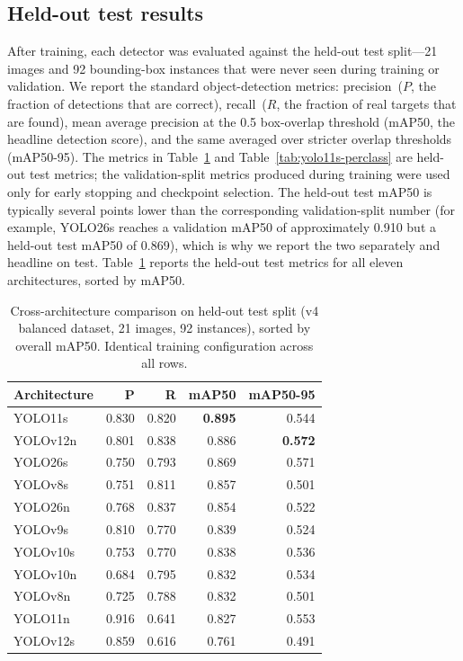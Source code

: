 \documentclass[10pt, letterpaper, twocolumn]{article}
\begin{document}
\subsection{Held-out test results}
\label{sec:results-test}

After training, each detector was evaluated against the held-out test split---21 images and 92 bounding-box instances that were never seen during training or validation. We report the standard object-detection metrics: precision~($P$, the fraction of detections that are correct), recall~($R$, the fraction of real targets that are found), mean average precision at the 0.5 box-overlap threshold (mAP50, the headline detection score), and the same averaged over stricter overlap thresholds (mAP50-95). The metrics in Table~\ref{tab:cross-arch} and Table~\ref{tab:yolo11s-perclass} are held-out test metrics; the validation-split metrics produced during training were used only for early stopping and checkpoint selection. The held-out test mAP50 is typically several points lower than the corresponding validation-split number (for example, YOLO26s reaches a validation mAP50 of approximately 0.910 but a held-out test mAP50 of 0.869), which is why we report the two separately and headline on test. Table~\ref{tab:cross-arch} reports the held-out test metrics for all eleven architectures, sorted by mAP50.

\begin{table}[t]
\caption{Cross-architecture comparison on held-out test split (v4 balanced dataset, 21 images, 92 instances), sorted by overall mAP50. Identical training configuration across all rows.}
\label{tab:cross-arch}
\centering
\begin{tabular}{lrrrr}
\toprule
\textbf{Architecture} & \textbf{P} & \textbf{R} & \textbf{mAP50} & \textbf{mAP50-95} \\
\midrule
YOLO11s   & 0.830 & 0.820 & \textbf{0.895} & 0.544 \\
YOLOv12n  & 0.801 & 0.838 & 0.886 & \textbf{0.572} \\
YOLO26s   & 0.750 & 0.793 & 0.869 & 0.571 \\
YOLOv8s   & 0.751 & 0.811 & 0.857 & 0.501 \\
YOLO26n   & 0.768 & 0.837 & 0.854 & 0.522 \\
YOLOv9s   & 0.810 & 0.770 & 0.839 & 0.524 \\
YOLOv10s  & 0.753 & 0.770 & 0.838 & 0.536 \\
YOLOv10n  & 0.684 & 0.795 & 0.832 & 0.534 \\
YOLOv8n   & 0.725 & 0.788 & 0.832 & 0.501 \\
YOLO11n   & 0.916 & 0.641 & 0.827 & 0.553 \\
YOLOv12s  & 0.859 & 0.616 & 0.761 & 0.491 \\
\bottomrule
\end{tabular}
\end{table}
\end{document}
